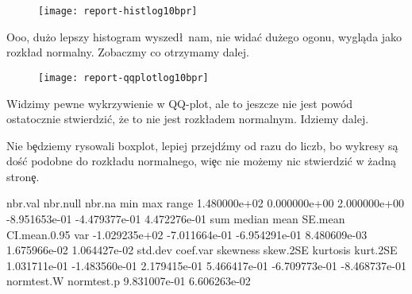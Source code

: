 \documentclass{article}
\begin{document}
\begin{Schunk}
\end{Schunk}

\begin{figure}[h!]
\centering
\begin{Schunk}
\end{Schunk}
\texttt{[image: report-histlog10bpr]}
\end{figure}

\noindent
\quad Ooo, dużo lepszy histogram wyszed\l\ nam, nie wida\'c dużego ogonu, wygląda jako rozk\l ad normalny. Zobaczmy co otrzymamy dalej.

\newpage
\begin{figure}[h!]
\centering
\texttt{[image: report-qqplotlog10bpr]}
\end{figure}

\noindent
\quad Widzimy pewne wykrzywienie w QQ-plot, ale to jeszcze nie jest powód ostatocznie stwierdzi\'c, że to nie jest rozk\l adem normalnym. Idziemy dalej.

\noindent
\quad Nie b\c edziemy rysowali boxplot, lepiej przejdźmy od razu do liczb, bo wykresy są doś\'c podobne do rozk\l adu normalnego, wi\c ec nie możemy nic stwierdzi\'c w żadną stron\c e.

\begin{Schunk}
\begin{Soutput}
      nbr.val      nbr.null        nbr.na           min           max         range 
 1.480000e+02  0.000000e+00  2.000000e+00 -8.951653e-01 -4.479377e-01  4.472276e-01 
          sum        median          mean       SE.mean  CI.mean.0.95           var 
-1.029235e+02 -7.011664e-01 -6.954291e-01  8.480609e-03  1.675966e-02  1.064427e-02 
      std.dev      coef.var      skewness      skew.2SE      kurtosis      kurt.2SE 
 1.031711e-01 -1.483560e-01  2.179415e-01  5.466417e-01 -6.709773e-01 -8.468737e-01 
   normtest.W    normtest.p 
 9.831007e-01  6.606263e-02 
\end{Soutput}
\end{Schunk}
\end{document}
